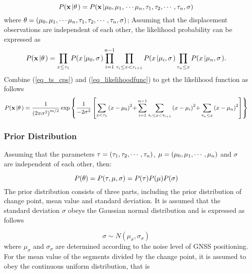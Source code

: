 \documentclass[final,3p,times]{elsarticle}
\begin{document}
	\begin{equation}\label{eq_likelihood}
	P({\bf{x}}\left| {\bf{\theta }} \right.) = P({\bf{x}}\left| {{\mu_0},{\mu_1},} \right. \cdots {\mu_n},{\tau _1},{\tau _2}, \cdots ,{\tau _n},\sigma )
	\end{equation}
	where ${\bf{\theta }}=({{\mu_0},{\mu_1},} \cdots {\mu_n},{\tau _1},{\tau _2}, \cdots ,{\tau _n},\sigma) $; Assuming that the displacement observations are independent of each other, the likelihood probability can be expressed as
	\begin{equation}\label{eq_likelihoodfunc}
	P({\bf{x}}\left| {\bf{\theta }} \right.) = \prod\limits_{x \le {\tau _1}} {P(x\left| {{\mu_0},\sigma } \right.)} \prod\limits_{i = 1}^{n - 1} {\prod\limits_{{\tau _i} \le x < {\tau _{i + 1}}} {P(x\left| {{\mu_i},\sigma } \right.)} \prod\limits_{{\tau _n} \le x} {P(x\left| {{\mu_n},\sigma } \right.)} }.
	\end{equation}
	Combine (\ref{eq_ts_cps}) and (\ref{eq_likelihoodfunc}) to get the likelihood function as follows
	\begin{equation}\label{eq_likelihoodfunc_detail}
	P({\bf{x}}\left| {\bf{\theta }} \right.) = \frac{1}{{{{(2\pi {\sigma ^2})}^{m/2}}}}\exp \left\{ {\frac{1}{{ - 2{\sigma ^2}}}\left[ {\sum\limits_{x < {\tau _1}} {{{(x - {\mu_0})}^2}} {\rm{ + }}\sum\limits_{i = 1}^{n - 1} {\sum\limits_{{\tau _i} \le x < {\tau _{i + 1}}} {{{(x - {\mu_i})}^2}} } {\rm{ + }}\sum\limits_{{\tau _n} \le x} {{{(x - {\mu_n})}^2}} } \right]} \right\}
	\end{equation}
	\subsubsection{Prior Distribution}
	Assuming that the parameters ${\bf{\tau }}=(\tau_1,\tau_2,\cdots,\tau_n)$, ${\bf{\mu }}=(\mu_0,\mu_1,\cdots,\mu_n)$ and $\sigma$ are independent of each other, then:
	
	\begin{equation}\label{eq_bayesian_prior}
	P({\bf{\theta }}) = P({\bf{\tau }},{\bf{\mu }},\sigma ) = P({\bf{\tau }})P({\bf{\mu }})P(\sigma )
	\end{equation}
	The prior distribution consists of three parts, including the prior distribution of change point, mean value and standard deviation. It is assumed that the standard deviation $\sigma$ obeys the Gaussian normal distribution and is expressed as follows
	
	\begin{equation}\label{eq_bayesian_prior_sigma}
	\sigma  \sim N({\mu _\sigma },{\sigma _\sigma })
	\end{equation}
	where $\mu_{\sigma}$ and $\sigma_{\sigma}$ are determined according to the noise level of GNSS positioning.
	For the mean value of the segments divided by the change point, it is assumed to obey the continuous uniform distribution, that is
	
\end{document}
